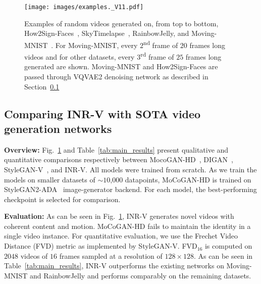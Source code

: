 \documentclass[10pt]{article} \usepackage[accepted]{tmlr}
\begin{document}
\begin{figure}[t]
  \centering
  \texttt{[image: images/examples.\_V11.pdf]}
  \caption{\small Examples of random videos generated on, from top to bottom, How2Sign-Faces~\cite{how2sign}, SkyTimelapse~\cite{skytimelapse}, RainbowJelly, and Moving-MNIST~\cite{moving-mnist}. For Moving-MNIST, every $2$\textsuperscript{nd} frame of $20$ frames long videos and for other datasets, every $3$\textsuperscript{rd} frame of $25$ frames long generated are shown. Moving-MNIST and How2Sign-Faces are passed through VQVAE2 denoising network as described in Section~\ref{sec:video-gen-compare}}
  \label{fig:main_results}
\end{figure}
 
\subsection{Comparing INR-V with SOTA video generation networks}
\label{sec:video-gen-compare}

\textbf{Overview: } Fig.~\ref{fig:main_results} and Table~\ref{tab:main_results} present qualitative and quantitative comparisons respectively between MocoGAN-HD~\cite{mocogan-hd}, DIGAN~\cite{digan},  StyleGAN-V~\cite{stylegan-v}, and INR-V. 
All models were trained from scratch. 
As we train the models on smaller datasets of $\sim10$,$000$ datapoints, MoCoGAN-HD is trained on StyleGAN2-ADA~\cite{stylegan2-ada} image-generator backend. For each model, the best-performing checkpoint is selected for comparison. 

\textbf{Evaluation:} As can be seen in Fig.~\ref{fig:main_results}, INR-V generates novel videos with coherent content and motion. MoCoGAN-HD fails to maintain the identity in a single video instance. 
For quantitative evaluation, we use the Frechet Video Distance (FVD) metric as implemented by StyleGAN-V. FVD{$_{16}$} is computed on $2048$ videos of $16$ frames sampled at a resolution of $128 \times 128$. As can be seen in Table~\ref{tab:main_results}, INR-V outperforms the existing networks on Moving-MNIST and RainbowJelly and performs comparably on the remaining datasets. 
\end{document}
